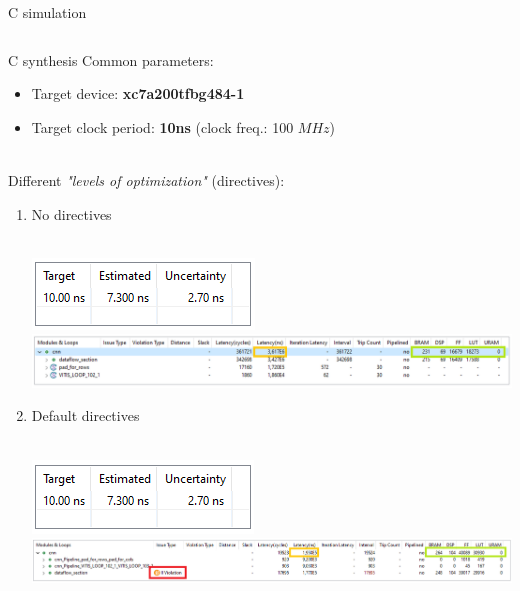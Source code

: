 \documentclass[10pt, xcolor=dvipsnames, compress]{beamer}
\begin{document}
\begin{frame}{C simulation}
\begin{spacing}{0.9}
\begin{columns}[T]
\begin{column}{.15\textwidth}
        \end{column}

    \end{columns}
    \end{spacing}
\end{frame}

\begin{frame}[allowframebreaks]{C synthesis}
    Common parameters:
    \begin{itemize}
        \item Target device: \textbf{xc7a200tfbg484-1}
        \item Target clock period: \textbf{10ns} (clock freq.: 100 $MHz$)\\~\
    \end{itemize}

    Different \textit{"levels of optimization"} (directives):

    \begin{enumerate}
        \item No directives\\~\

        \includegraphics[width=.2\textwidth]{Synthesis-result/no_opt_timing.png}
        \linebreak
        \includegraphics[width=\textwidth]{Synthesis-result/no_opt.png}

    \framebreak
        \item Default directives\\~\


        \includegraphics[width=.2\textwidth]{Synthesis-result/opt_def_timing.png}
        \linebreak
        \includegraphics[width=\textwidth]{Synthesis-result/opt_def.png}



\end{enumerate}
\end{frame}
\end{document}
